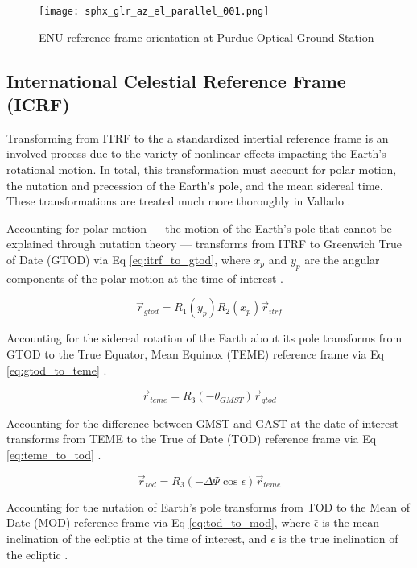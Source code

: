 \begin{figure}[ht]
  \centering
  \texttt{[image: sphx\_glr\_az\_el\_parallel\_001.png]}
  \caption{ENU reference frame orientation at Purdue Optical Ground Station}
  \label{fig:pogs_enu}
\end{figure}

\subsection{International Celestial Reference Frame (ICRF)}

Transforming from ITRF to the a standardized intertial reference frame is an involved process due to the variety of nonlinear effects impacting the Earth's rotational motion. In total, this transformation must account for polar motion, the nutation and precession of the Earth's pole, and the mean sidereal time. These transformations are treated much more thoroughly in Vallado \cite{vallado4ed}. 

Accounting for polar motion --- the motion of the Earth's pole that cannot be explained through nutation theory --- transforms from ITRF to Greenwich True of Date (GTOD) via Eq \ref{eq:itrf_to_gtod}, where $x_p$ and $y_p$ are the angular components of the polar motion at the time of interest \cite{frueh2019notes}.

\begin{equation} \label{eq:itrf_to_gtod}
  \vec{r}_{gtod} = R_1(y_p) R_2(x_p) \vec{r}_{itrf}
\end{equation}

Accounting for the sidereal rotation of the Earth about its pole transforms from GTOD to the True Equator, Mean Equinox (TEME) reference frame via Eq \ref{eq:gtod_to_teme} \cite{frueh2019notes}.

\begin{equation} \label{eq:gtod_to_teme}
  \vec{r}_{teme} = R_3(-\theta_{GMST}) \vec{r}_{gtod}
\end{equation}

Accounting for the difference between GMST and GAST at the date of interest transforms from TEME to the True of Date (TOD) reference frame via Eq \ref{eq:teme_to_tod} \cite{vallado4ed}.

\begin{equation} \label{eq:teme_to_tod}
  \vec{r}_{tod} = R_3(-\Delta \Psi \cos \epsilon) \vec{r}_{teme}
\end{equation}

Accounting for the nutation of Earth's pole transforms from TOD to the Mean of Date (MOD) reference frame via Eq \ref{eq:tod_to_mod}, where $\bar{\epsilon}$ is the mean inclination of the ecliptic at the time of interest, and $\epsilon$ is the true inclination of the ecliptic \cite{vallado4ed}.


